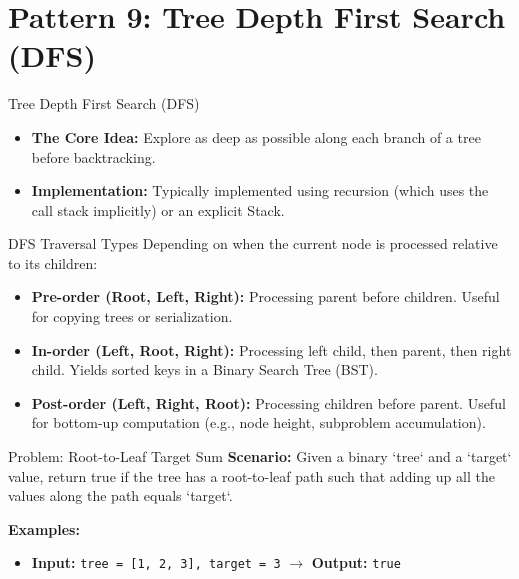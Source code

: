\section{Pattern 9: Tree Depth First Search (DFS)}

\begin{frame}[c]{\empty}
    \begin{center}
        \Large\textbf{\secname}
    \end{center}
\end{frame}

\begin{frame}{Tree Depth First Search (DFS)}
  \begin{itemize}
    \item \textbf{The Core Idea:} Explore as deep as possible along each branch of a tree before backtracking.
    \item \textbf{Implementation:} Typically implemented using recursion (which uses the call stack implicitly) or an explicit Stack.
  \end{itemize}
\end{frame}

\begin{frame}{DFS Traversal Types}
  Depending on when the current node is processed relative to its children:
  \begin{itemize}
    \item \textbf{Pre-order (Root, Left, Right):} Processing parent before children. Useful for copying trees or serialization.
    \item \textbf{In-order (Left, Root, Right):} Processing left child, then parent, then right child. Yields sorted keys in a Binary Search Tree (BST).
    \item \textbf{Post-order (Left, Right, Root):} Processing children before parent. Useful for bottom-up computation (e.g., node height, subproblem accumulation).
  \end{itemize}
\end{frame}

\begin{frame}[fragile]{Problem: Root-to-Leaf Target Sum}
  \textbf{Scenario:}
  Given a binary `tree` and a `target` value, return true if the tree has a root-to-leaf path such that adding up all the values along the path equals `target`.
  
  \vspace{0.3cm}
  \textbf{Examples:}
  \begin{itemize}
    \item \textbf{Input:} \texttt{tree = [1, 2, 3], target = 3} $\rightarrow$ \textbf{Output:} \texttt{true}
  \end{itemize}
\end{frame}

